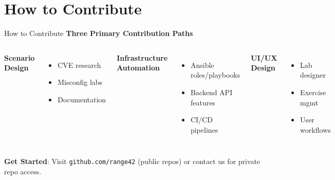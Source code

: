 \documentclass[aspectratio=169]{beamer}
\begin{document}
\section{How to Contribute}

\begin{frame}[squeeze]{How to Contribute \; \faUsers}
  \textbf{Three Primary Contribution Paths}\\[2mm]
  
  \begin{columns}[T]
    \textbf{Scenario Design}
    \begin{itemize}
      \item CVE research
      \item Misconfig labs
      \item Documentation
    \end{itemize}
    
    \textbf{Infrastructure Automation}
    \begin{itemize}
      \item Ansible roles/playbooks
      \item Backend API features
      \item CI/CD pipelines
    \end{itemize}
    
    \textbf{UI/UX Design}
    \begin{itemize}
      \item Lab designer
      \item Exercise mgmt
      \item User workflows
    \end{itemize}
  \end{columns}
  \vspace{3mm}
  \begin{tcolorbox}
    \faGithub\; \textbf{Get Started}: Visit \texttt{github.com/range42} (public repos) or contact us for private repo access.
  \end{tcolorbox}
\end{frame}
\end{document}
